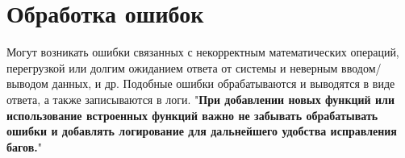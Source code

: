 \documentclass[a4paper, 12pt]{report}
\begin{document}
\section{Обработка ошибок}
\textrm{
    Могут возникать ошибки связанных с некорректным математических операций, перегрузкой или долгим ожиданием ответа от системы и неверным вводом/выводом данных, и др. Подобные ошибки обрабатываются и выводятся в виде ответа, а также записываются в логи. "{\bfseries При добавлении новых функций или использование встроенных функций важно не забывать обрабатывать ошибки и добавлять логирование для дальнейшего удобства исправления багов.}"
}
\clearpage
\end{document}
